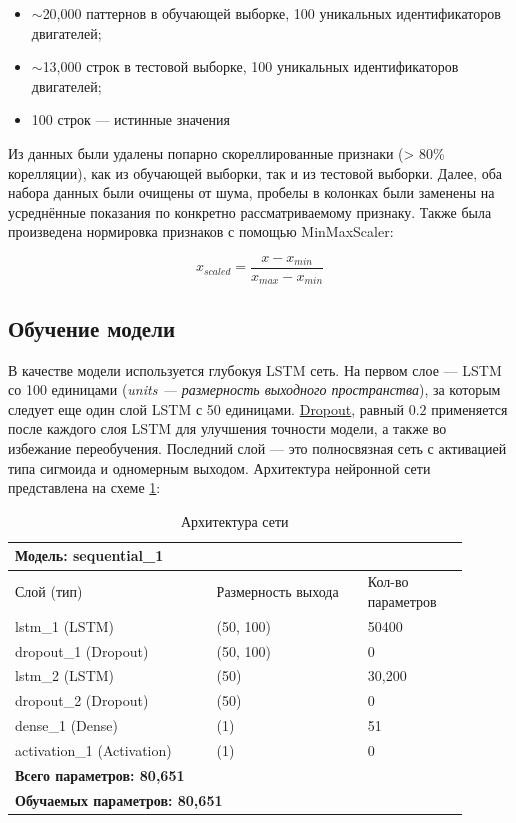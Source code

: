 \documentclass[14pt]{extarticle}
\begin{document}
\begin{itemize}
    \item $\sim$20,000 паттернов в обучающей выборке, 100 уникальных идентификаторов двигателей;
    \item $\sim$13,000 строк в тестовой выборке, 100 уникальных идентификаторов двигателей;
    \item 100 строк --- истинные значения
\end{itemize}

Из данных были удалены попарно скореллированные признаки (> 80\% корелляции), как из обучающей выборки, так и из тестовой выборки. Далее, оба набора данных были очищены от шума, пробелы в колонках были заменены на усреднённые показания по конкретно рассматриваемому признаку. Также была произведена нормировка признаков с помощью MinMaxScaler:

$$x_{scaled} = \frac{x - x_{min}}{x_{max} - x_{min}}$$ 



\subsection{Обучение модели}

В качестве модели используется глубокуя LSTM сеть. На первом слое --- LSTM со 100 единицами ({\it units --- размерность выходного пространства}), за которым следует еще один слой LSTM с 50 единицами. \hyperref[glossary]{Dropout}, равный $0.2$ применяется после каждого слоя LSTM для улучшения точности модели, а также во избежание переобучения. Последний слой --- это полносвязная сеть с активацией типа сигмоида и одномерным выходом. Архитектура нейронной сети представлена на схеме \ref{table_1}:

\begin{table}[h]
	\large
	\centering
	\begin{tabular}{p{0.4\linewidth}p{0.3\linewidth}p{0.2\linewidth}}
		\multicolumn{3}{p{0.9\linewidth}}{{\bf Модель: sequential\_1}} \\
		\hline
		Слой (тип) & Размерность выхода & Кол-во параметров \\
		\hline
		\hline
		lstm\_1 (LSTM) & (50, 100) & 50400 \\
		\hline
		dropout\_1 (Dropout) & (50, 100) & 0 \\
		\hline
		lstm\_2 (LSTM) & (50) & 30,200 \\
		\hline
		dropout\_2 (Dropout) & (50) & 0 \\
		\hline
		dense\_1 (Dense) & (1) & 51 \\
		\hline
		activation\_1 (Activation) & (1) & 0 \\
		\hline
		\hline
		\multicolumn{3}{p{0.9\linewidth}}{{\bf Всего параметров: 80,651}} \\[-3mm]
		\multicolumn{3}{p{0.9\linewidth}}{{\bf Обучаемых параметров: 80,651}} \\
	\end{tabular}
	\caption{Архитектура сети}
	\label{table_1}
\end{table}
\end{document}
